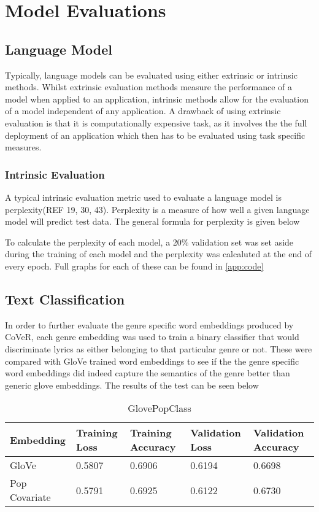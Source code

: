 \section{Model Evaluations}
\subsection{Language Model}
Typically, language models can be evaluated using either extrinsic or intrinsic methods. Whilst extrinsic evaluation methods measure the performance of a model when applied to an application, intrinsic methods allow for the evaluation of a model independent of any application. A drawback of using extrinsic evaluation is that it is computationally expensive task, as it involves the the full deployment of an application which then has to be evaluated using task specific measures.
\subsubsection{Intrinsic Evaluation}
A typical intrinsic evaluation metric used to evaluate a language model is perplexity(REF 19, 30, 43). Perplexity is a measure of how well a given language model will predict test data. The general formula for perplexity is given below

\noindent
\newline
To calculate the perplexity of each model, a 20\% validation set was set aside during the training of each model and the perplexity was calcaluted at the end of every epoch. Full graphs for each of these can be found in \autoref{app:code} 

\noindent
\newline


\subsection{Text Classification}
In order to further evaluate the genre specific word embeddings produced by CoVeR, each genre embedding was used to train a binary classifier that would discriminate lyrics as either belonging to that particular genre or not. These were compared with GloVe trained word embeddings to see if the the genre specific word embeddings did indeed capture the semantics of the genre better than generic glove embeddings. The results of the test can be seen below

\begin{table}[ht]
	\centering
	\begin{tabular}{ | p{3cm} | p{2cm} | p{2cm} | p{2cm} | p{2cm} |}
		\hline
		\textbf{Embedding} & \textbf{Training Loss} & \textbf{Training Accuracy} & \textbf{Validation Loss} & \textbf{Validation Accuracy}\\ \hline
		GloVe & 0.5807 & 0.6906 & 0.6194 & 0.6698\\ \hline
		Pop Covariate & 0.5791 & 0.6925 & 0.6122 & 0.6730\\ \hline
	\end{tabular}
	\label{Tab:GlovePopClass}
	\caption{GlovePopClass}
\end{table}

